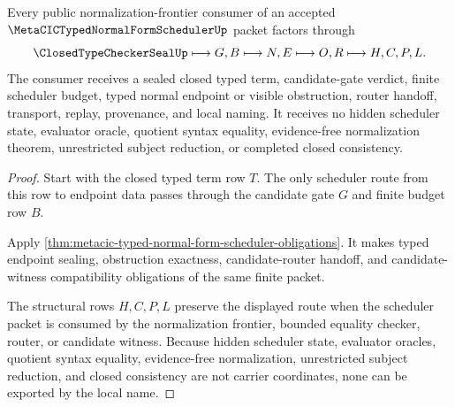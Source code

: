 \begin{theorem}
\label{thm:metacic-typed-normal-form-scheduler-nonescape}
Every public normalization-frontier consumer of an accepted $\MetaCICTypedNormalFormSchedulerUp$ packet factors through
$$
\ClosedTypeCheckerSealUp \longmapsto G,B \longmapsto N,E \longmapsto O,R \longmapsto H,C,P,L .
$$
The consumer receives a sealed closed typed term, candidate-gate verdict, finite scheduler budget, typed normal endpoint or visible obstruction, router handoff, transport, replay, provenance, and local naming. It receives no hidden scheduler state, evaluator oracle, quotient syntax equality, evidence-free normalization theorem, unrestricted subject reduction, or completed closed consistency.
\end{theorem}
\begin{proof}
Start with the closed typed term row $T$. The only scheduler route from this row to endpoint data passes through the candidate gate $G$ and finite budget row $B$.

Apply \autoref{thm:metacic-typed-normal-form-scheduler-obligations}. It makes typed endpoint sealing, obstruction exactness, candidate-router handoff, and candidate-witness compatibility obligations of the same finite packet.

The structural rows $H,C,P,L$ preserve the displayed route when the scheduler packet is consumed by the normalization frontier, bounded equality checker, router, or candidate witness. Because hidden scheduler state, evaluator oracles, quotient syntax equality, evidence-free normalization, unrestricted subject reduction, and closed consistency are not carrier coordinates, none can be exported by the local name.
\end{proof}



